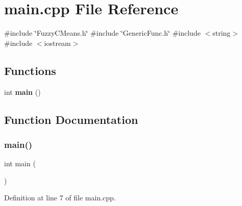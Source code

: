 \section{main.\+cpp File Reference}
\label{main_8cpp}
{\ttfamily \#include \char`\"{}Fuzzy\+C\+Means.\+h\char`\"{}}\newline
{\ttfamily \#include \char`\"{}Generic\+Func.\+h\char`\"{}}\newline
{\ttfamily \#include $<$string$>$}\newline
{\ttfamily \#include $<$iostream$>$}\newline
\subsection*{Functions}
\begin{DoxyCompactItemize}
\item 
int \textbf{ main} ()
\end{DoxyCompactItemize}


\subsection{Function Documentation}
\mbox{\label{main_8cpp_ae66f6b31b5ad750f1fe042a706a4e3d4}} 
\subsubsection{main()}
{\footnotesize\ttfamily int main (\begin{DoxyParamCaption}{ }\end{DoxyParamCaption})}



Definition at line 7 of file main.\+cpp.

